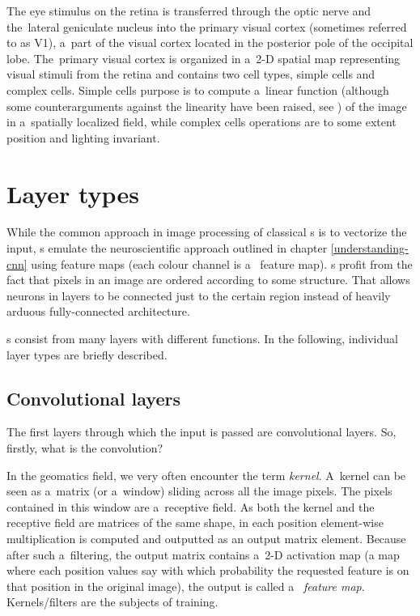 The eye stimulus on the retina is transferred through the optic nerve and
the~lateral geniculate nucleus into the primary visual cortex (sometimes referred to 
as V1), a~part of the visual cortex located in the posterior pole of the 
occipital lobe. The~primary visual cortex is organized in a~2-D spatial map 
representing visual stimuli from the retina and contains two cell types, simple 
cells and complex cells. Simple cells purpose is to compute a~linear function 
(although some counterarguments against the linearity have been raised, see 
\cite{simple-cells}) of the image in a~spatially localized field, while complex 
cells operations are to some extent position and lighting invariant. 

\section{Layer types}
\label{layers}

While the common approach in image processing of classical s is to 
vectorize the input, s emulate the neuroscientific approach outlined in 
chapter \ref{understanding-cnn} using feature maps (each colour channel is a~
feature map). s profit from the fact that pixels in an image are ordered 
according to some structure. That allows neurons in layers to be connected just 
to the certain region instead of heavily arduous fully-connected architecture. 

s consist from many layers with different functions. In the following, 
individual layer types are briefly described. 

\subsection{Convolutional layers}
\label{conv-layers}

The first layers through which the input is passed are convolutional layers. So, 
firstly, what is the convolution? 

In the geomatics field, we very often encounter the term \textit{kernel}. A~kernel 
can be seen as a~matrix (or a~window) sliding across all the image pixels. The 
pixels contained in this window are a~receptive field. As both the kernel and 
the receptive field are matrices of the same shape, in each position element-wise
multiplication is computed and outputted as an output matrix element. 
Because after such a~filtering, the output matrix contains a~2-D activation map 
(a map where each position values say with which probability the requested 
feature is on that position in the original image), the output is called a~
\textit{feature map}. Kernels/filters are the subjects of training. 

